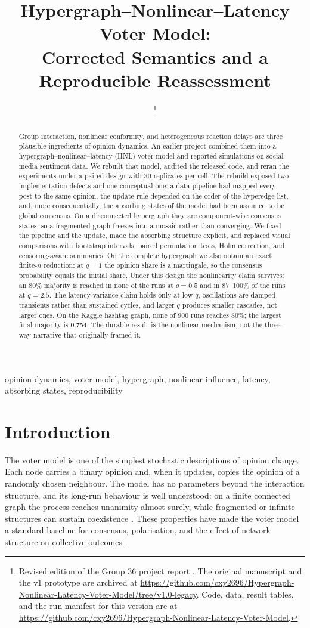 \documentclass[conference]{IEEEtran}
\title{Hypergraph--Nonlinear--Latency Voter Model:\\
Corrected Semantics and a Reproducible Reassessment}
\author{%
\IEEEauthorblockN{Xinyi Cui, Leyi Yan, Ruiying Cai, Chaowei Xiao}
\IEEEauthorblockA{Group 36}
\thanks{Revised edition of the Group 36 project report \cite{hnl2024}. The original manuscript and the v1 prototype are archived at \url{https://github.com/cxy2696/Hypergraph-Nonlinear-Latency-Voter-Model/tree/v1.0-legacy}. Code, data, result tables, and the run manifest for this version are at \url{https://github.com/cxy2696/Hypergraph-Nonlinear-Latency-Voter-Model}.}
}
\begin{document}
\maketitle

\begin{abstract}
Group interaction, nonlinear conformity, and heterogeneous reaction delays are three plausible ingredients of opinion dynamics. An earlier project combined them into a hypergraph--nonlinear--latency (HNL) voter model and reported simulations on social-media sentiment data. We rebuilt that model, audited the released code, and reran the experiments under a paired design with 30 replicates per cell. The rebuild exposed two implementation defects and one conceptual one: a data pipeline had mapped every post to the same opinion, the update rule depended on the order of the hyperedge list, and, more consequentially, the absorbing states of the model had been assumed to be global consensus. On a disconnected hypergraph they are component-wise consensus states, so a fragmented graph freezes into a mosaic rather than converging. We fixed the pipeline and the update, made the absorbing structure explicit, and replaced visual comparisons with bootstrap intervals, paired permutation tests, Holm correction, and censoring-aware summaries. On the complete hypergraph we also obtain an exact finite-$n$ reduction: at $q=1$ the opinion share is a martingale, so the consensus probability equals the initial share. Under this design the nonlinearity claim survives: an 80\% majority is reached in none of the runs at $q=0.5$ and in 87--100\% of the runs at $q=2.5$. The latency-variance claim holds only at low $q$, oscillations are damped transients rather than sustained cycles, and larger $q$ produces smaller cascades, not larger ones. On the Kaggle hashtag graph, none of 900 runs reaches 80\%; the largest final majority is 0.754. The durable result is the nonlinear mechanism, not the three-way narrative that originally framed it.
\end{abstract}

\begin{IEEEkeywords}
opinion dynamics, voter model, hypergraph, nonlinear influence, latency, absorbing states, reproducibility
\end{IEEEkeywords}

\section{Introduction}

The voter model is one of the simplest stochastic descriptions of opinion change. Each node carries a binary opinion and, when it updates, copies the opinion of a randomly chosen neighbour. The model has no parameters beyond the interaction structure, and its long-run behaviour is well understood: on a finite connected graph the process reaches unanimity almost surely, while fragmented or infinite structures can sustain coexistence \cite{clifford1973,holley1975,liggett1999}. These properties have made the voter model a standard baseline for consensus, polarisation, and the effect of network structure on collective outcomes \cite{castellano2009,sood2005,baronchelli2018}.
\end{document}
